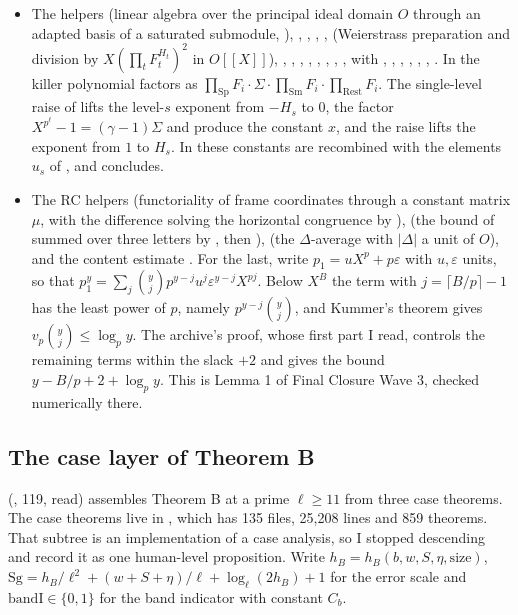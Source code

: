 \documentclass[11pt]{article}
\newcommand{\Sg}{\mathrm{Sg}}
\theoremstyle{definition}
\theoremstyle{remark}
\begin{document}
\begin{itemize}[leftmargin=*,itemsep=1pt]
\item The  helpers  (linear algebra over the principal ideal domain $O$ through an adapted basis of a saturated submodule, ), , , , ,  (Weierstrass preparation and division by $X(\prod_tF_t^{H_t})^2$ in $O[[X]]$), , , , , , , , ,  with , , , , , , . In  the killer polynomial factors as $\prod_{\mathrm{Sp}}F_i\cdot\Sigma\cdot\prod_{\mathrm{Sm}}F_i\cdot\prod_{\mathrm{Rest}}F_i$. The single-level raise of  lifts the level-$s$ exponent from $-H_s$ to $0$, the factor $X^{p^\ell}-1=(\gamma-1)\Sigma$ and  produce the constant $x$, and the raise lifts the exponent from $1$ to $H_s$. In  these constants are recombined with the elements $u_s$ of , and  concludes.
\item The RC helpers  (functoriality of frame coordinates through a constant matrix $\mu$, with the difference solving the horizontal congruence by ),  (the bound of  summed over three letters by , then ),  (the $\Delta$-average with $\lvert\Delta\rvert$ a unit of $O$), and the content estimate . For the last, write $p_1=uX^p+p\varepsilon$ with $u,\varepsilon$ units, so that $p_1^y=\sum_j\binom yjp^{y-j}u^j\varepsilon^{y-j}X^{pj}$. Below $X^B$ the term with $j=\lceil B/p\rceil-1$ has the least power of $p$, namely $p^{y-j}\binom yj$, and Kummer's theorem gives $v_p\binom yj\le\log_py$. The archive's proof, whose first part I read, controls the remaining terms within the slack $+2$ and gives the bound $y-B/p+2+\log_py$. This is Lemma 1 of Final Closure Wave 3, checked numerically there.
\end{itemize}

\subsection*{The case layer of Theorem B}

 (, 119, read) assembles Theorem B at a prime $\ell\ge11$ from three case theorems. The case theorems live in , which has 135 files, 25{,}208 lines and 859 theorems. That subtree is an implementation of a case analysis, so I stopped descending and record it as one human-level proposition. Write $h_B=h_B(b,w,S,\eta,\mathrm{size})$, $\Sg=h_B/\ell^2+(w+S+\eta)/\ell+\log_\ell(2h_B)+1$ for the error scale and $\mathrm{bandI}\in\{0,1\}$ for the band indicator with constant $C_b$.
\end{document}

